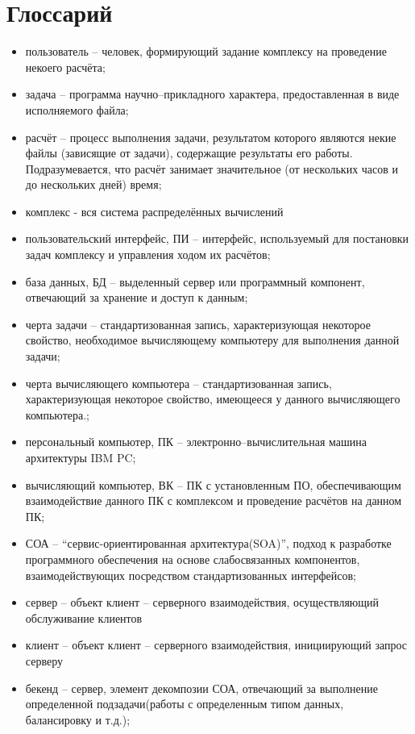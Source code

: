 \documentclass[a4paper,12pt]{report}
\numberwithin{equation}{section}
\begin{document}
  \section*{Глоссарий}
  \begin{itemize}
    \item пользователь -- человек, формирующий задание комплексу на проведение некоего расчёта;
    \item задача -- программа научно--прикладного характера, предоставленная в виде исполняемого файла;
    \item расчёт -- процесс выполнения задачи, результатом которого являются некие файлы (зависящие от задачи), содержащие результаты его работы. Подразумевается, что расчёт занимает значительное (от нескольких часов и до нескольких дней) время;
    \item комплекс - вся система распределённых вычислений
    \item пользовательский интерфейс, ПИ -- интерфейс, используемый для постановки задач комплексу и управления ходом их расчётов;
    \item база данных, БД -- выделенный сервер или программный компонент, отвечающий за хранение и доступ к данным;
    \item черта задачи -- стандартизованная запись, характеризующая некоторое свойство, необходимое вычисляющему компьютеру для выполнения данной задачи;
    \item черта вычисляющего компьютера -- стандартизованная запись, характеризующая некоторое свойство, имеющееся у данного вычисляющего компьютера.;
    \item персональный компьютер, ПК -- электронно--вычислительная машина архитектуры IBM PC;
    \item вычисляющий компьютер, ВК -- ПК с установленным ПО, обеспечивающим взаимодействие данного ПК с комплексом и проведение расчётов на данном ПК;
    \item СОА -- ``сервис-ориентированная архитектура(SOA)'', подход к разработке программного обеспечения на основе слабосвязанных компонентов, взаимодействующих посредством стандартизованных интерфейсов;
    \item сервер -- объект клиент -- серверного взаимодействия, осуществляющий обслуживание клиентов
    \item клиент -- объект клиент -- серверного взаимодействия, инициирующий запрос серверу
    \item бекенд -- сервер, элемент декомпозии СОА, отвечающий за выполнение определенной подзадачи(работы с определенным типом данных, балансировку и т.д.);

\end{itemize}
\end{document}
